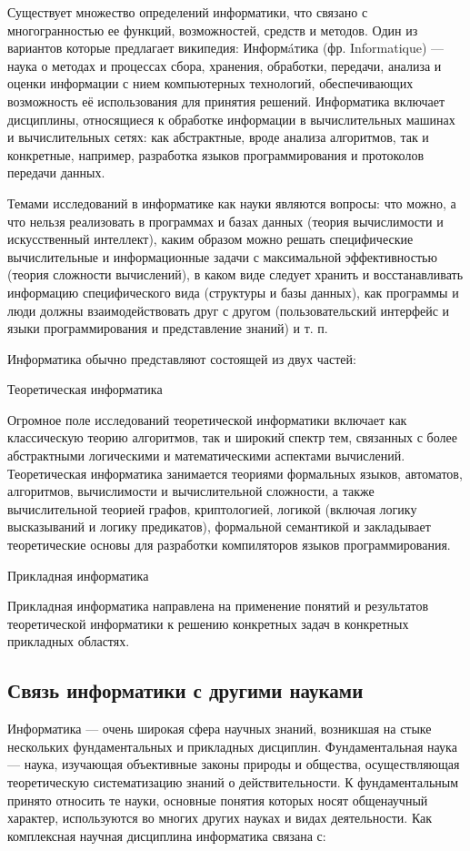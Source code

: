 \documentclass[a4paper]{article}
\begin{document}
Существует множество определений информатики, что связано с многогранностью ее функций, возможностей, средств и методов. Один из вариантов которые предлагает википедия: Информáтика (фр. Informatique) — наука о методах и процессах сбора, хранения, обработки, передачи, анализа и оценки информации с нием компьютерных технологий, обеспечивающих возможность её использования для принятия решений. Информатика включает дисциплины, относящиеся к обработке информации в вычислительных машинах и вычислительных сетях: как абстрактные, вроде анализа алгоритмов, так и конкретные, например, разработка языков программирования и протоколов передачи данных.

Темами исследований в информатике как науки являются вопросы: что можно, а что нельзя реализовать в программах и базах данных (теория вычислимости и искусственный интеллект), каким образом можно решать специфические вычислительные и информационные задачи с максимальной эффективностью (теория сложности вычислений), в каком виде следует хранить и восстанавливать информацию специфического вида (структуры и базы данных), как программы и люди должны взаимодействовать друг с другом (пользовательский интерфейс и языки программирования и представление знаний) и т. п.

Информатика обычно представляют состоящей из двух частей:

Теоретическая информатика

Огромное поле исследований теоретической информатики включает как классическую теорию алгоритмов, так и широкий спектр тем, связанных с более абстрактными логическими и математическими аспектами вычислений. Теоретическая информатика занимается теориями формальных языков, автоматов, алгоритмов, вычислимости и вычислительной сложности, а также вычислительной теорией графов, криптологией, логикой (включая логику высказываний и логику предикатов), формальной семантикой и закладывает теоретические основы для разработки компиляторов языков программирования.

Прикладная информатика

Прикладная информатика направлена на применение понятий и результатов теоретической информатики к решению конкретных задач в конкретных прикладных областях.

\subsection{Связь информатики с другими науками}

Информатика — очень широкая сфера научных знаний, возникшая на стыке нескольких фундаментальных и прикладных дисциплин. Фундаментальная наука — наука, изучающая объективные законы природы и общества, осуществляющая теоретическую систематизацию знаний о действительности. К фундаментальным принято относить те науки, основные понятия которых носят общенаучный характер, используются во многих других науках и видах деятельности. Как комплексная научная дисциплина информатика связана с:
\end{document}
